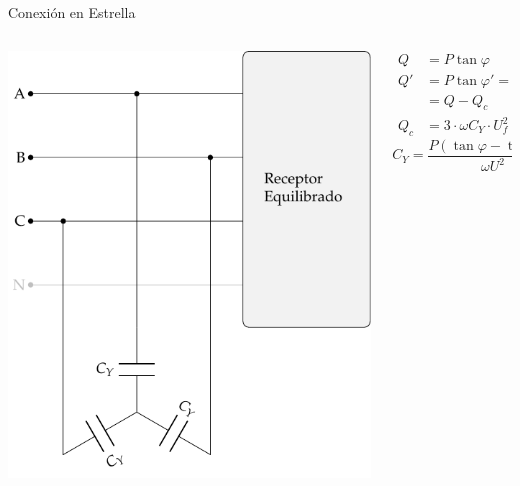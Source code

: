 \documentclass[aspectratio=169, usenames,svgnames,dvipsnames]{beamer}
\begin{document}
\begin{frame}[label={sec:org9718ab4}]{Conexión en Estrella}
\begin{columns}
\begin{column}{0.5\columnwidth}
\begin{center}
\includegraphics[width=.9\linewidth]{../figs/CircuitoTrifasicaY_CompensacionReactiva.pdf}
\end{center}
\end{column}
\begin{column}{0.5\columnwidth}
\begin{align*}
  Q &= P\tan\varphi\\
  Q' &= P\tan\varphi' =\\
    &= Q - Q_c\\
  Q_c &= 3 \cdot \omega C_Y \cdot U_f^2
\end{align*}
\[
  \boxed{C_Y = \frac{P(\tan \varphi - \tan \varphi')}{\omega U^2}}
\]
\end{column}
\end{columns}
\end{frame}
\end{document}
